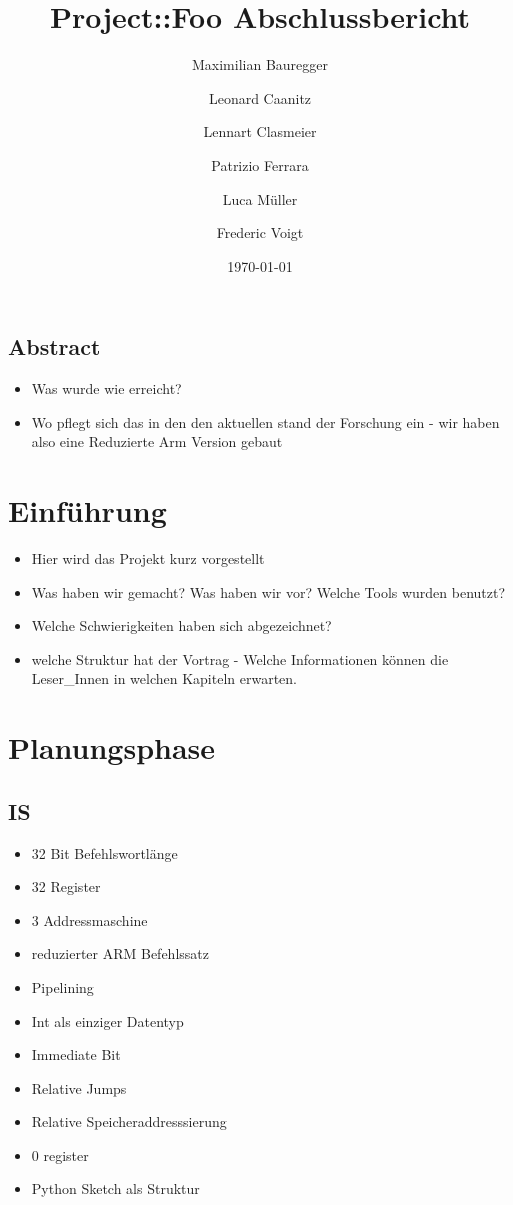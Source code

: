 \documentclass[paper=a4,fontsize=10pt]{scrreprt}
\title{Project::Foo Abschlussbericht}
\author{Maximilian Bauregger \and Leonard Caanitz \and Lennart Clasmeier \and Patrizio Ferrara \and Luca Müller \and Frederic Voigt}
\date{\today}
\begin{document}
\maketitle

\section{Abstract}

\begin{itemize}
    \item Was wurde wie erreicht?
    \item Wo pflegt sich das in den den aktuellen stand der Forschung ein - wir haben also eine Reduzierte Arm Version gebaut
\end{itemize}


\chapter{Einführung}
\begin{itemize}
    \item Hier wird das Projekt kurz vorgestellt
    \item Was haben wir gemacht? Was haben wir vor? Welche Tools wurden benutzt?
    \item Welche Schwierigkeiten haben sich abgezeichnet?
    \item welche Struktur hat der Vortrag - Welche Informationen können die Leser\_Innen in welchen Kapiteln erwarten.
\end{itemize}

\chapter{Planungsphase}

\section{IS}

\begin{itemize}
    \item 32 Bit Befehlswortlänge
    \item 32 Register
    \item 3 Addressmaschine
    \item reduzierter ARM Befehlssatz
    \item Pipelining
    \item Int als einziger Datentyp
    \item Immediate Bit
    \item Relative Jumps
    \item Relative Speicheraddresssierung
    \item 0 register
    \item Python Sketch als Struktur
\end{itemize}
\end{document}
